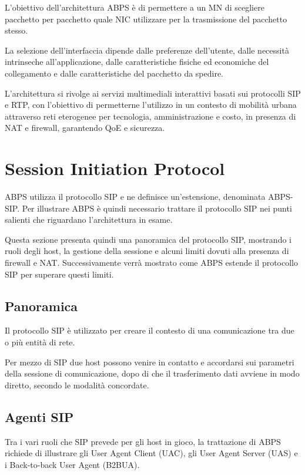 \documentclass[12pt,a4paper,openright,twoside]{book}
\begin{document}
L'obiettivo dell'architettura ABPS è di permettere a un MN di
scegliere pacchetto per pacchetto quale NIC utilizzare per la
trasmissione del pacchetto stesso.

La selezione dell'interfaccia dipende dalle preferenze dell'utente,
dalle necessità intrinseche all'applicazione, dalle caratteristiche
fisiche ed economiche del collegamento e dalle caratteristiche del
pacchetto da spedire.

L'architettura si rivolge ai servizi multimediali interattivi basati
sui protocolli SIP e RTP, con l'obiettivo di permetterne l'utilizzo in
un contesto di mobilità urbana attraverso reti eterogenee per
tecnologia, amministrazione e costo, in presenza di NAT e firewall,
garantendo QoE e sicurezza.

\section{Session Initiation Protocol}

ABPS utilizza il protocollo SIP e ne definisce un'estensione,
denominata ABPS-SIP. Per illustrare ABPS è quindi necessario trattare
il protocollo SIP nei punti salienti che riguardano l'architettura in
esame.

Questa sezione presenta quindi una panoramica del protocollo SIP,
mostrando i ruoli degli host, la gestione della sessione e alcuni
limiti dovuti alla presenza di firewall e NAT. Successivamente verrà
mostrato come ABPS estende il protocollo SIP per superare questi
limiti.

\subsection{Panoramica}

Il protocollo SIP è utilizzato per creare il contesto di una
comunicazione tra due o più entità di rete.

Per mezzo di SIP due host possono venire in contatto e accordarsi sui
parametri della sessione di comunicazione, dopo di che il
trasferimento dati avviene in modo diretto, secondo le modalità
concordate.

\subsection{Agenti SIP}

Tra i vari ruoli che SIP prevede per gli host in gioco, la trattazione
di ABPS richiede di illustrare gli User Agent Client (UAC), gli User
Agent Server (UAS) e i Back-to-back User Agent (B2BUA).
\end{document}
